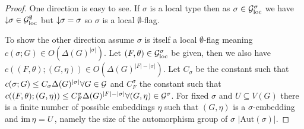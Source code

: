 \begin{proof}
    One direction is easy to see. If $\sigma$ is a local type then as $\sigma\in\mathcal{G}_\mathrm{loc}^\sigma$
    we have ${\downarrow\!\!\sigma}\in\mathcal{G}_\mathrm{loc}^\emptyset$ but ${\downarrow\!\!\sigma}=\sigma$ so
    $\sigma$ is a local $\emptyset$-flag.

    To show the other direction assume $\sigma$ is itself a local $\emptyset$-flag
    meaning\\
    $c(\sigma; G) \in O(\Delta(G)^{|\sigma|})$. Let $(F, \theta) \in\mathcal{G}_\mathrm{loc}^\sigma$ be
    given, then we also have\\
    $c((F, \theta); (G, \eta)) \in O(\Delta(G)^{|F|-|\sigma|})$.
    Let $C_\sigma$ be the constant such that\\
    $c(\sigma; G) \leq C_\sigma \Delta(G)^{|\sigma|}\forall G\in\mathcal{G}$ and
    $C_F^\sigma$ the constant such that\\
    $c((F, \theta); (G, \eta)) \leq C_F^\sigma\Delta(G)^{|F|-|\sigma|}\forall
    (G,\eta)\in\mathcal{G}^\sigma$. For fixed $\sigma$ and $U \subseteq V(G)$ there is
    a finite number of possible embeddings $\eta$ such that $(G,\eta)$ is a
    $\sigma$-embedding and $\operatorname{im}\eta=U$, namely the size of the automorphism group of $\sigma$
    $|\mathrm{Aut}(\sigma)|$.


\end{proof}
